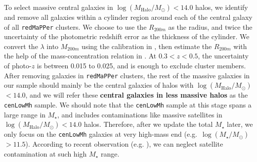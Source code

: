 \documentclass{emulateapj}
\def\redm{\texttt{redMaPPer}}
\def\nbcg{\texttt{cenLowMh}}
\def\mstar{{$M_{\star}$}}
\def\logms{{$\log (M_{\star}/M_{\odot})$}}
\def\logmh{{$\log (M_{\mathrm{Halo}}/M_{\odot})$}}
\begin{document}
\begin{CJK*}{UTF8}{gbsn}
    To select massive central galaxies in \logmh{}$<14.0$ halos, we identify and 
    remove all galaxies within a cylinder region around each of the central galaxy of 
    all \redm{} clusters.
    We choose to use the $R_{200m}$ as the radius, and twice the uncertainty of the 
    photometric redshift error as the thickness of the cylinder. 
    We convert the $\lambda$ into $M_{200m}$ using the calibration in 
    \citet{Simet2016}, then estimate the $R_{200m}$ with the help of the 
    mass-concentration relation in \citet{Diemer2015}. 
    At $0.3 < z < 0.5$, the uncertainty of photo-$z$ is between 0.015 to 0.025, 
    and is enough to exclude cluster members.
    After removing galaxies in \redm{} clusters, the rest of the massive galaxies 
    in our sample should mainly be the central galaxies of halos with \logmh{}$<14.0$,
    and we will refer these \textbf{central galaxies in less massive halos} as the 
    \nbcg{} sample.
    We should note that the \nbcg{} sample at this stage spans a large range in 
    \mstar{}, and includes contaminations like massive satellites in \logmh{}$< 14.0$ 
    halos.  
    Therefore, after we update the total \mstar{} later, we only focus on the 
    \nbcg{} galaxies at very high-mass end (e.g.~\logms{}$ > 11.5$). 
    According to recent observation (e.g. \citealt{vanUitert2016}), we can neglect 
    satellite contamination at such high \mstar{} range. 
    

\end{CJK*}
\end{document}
